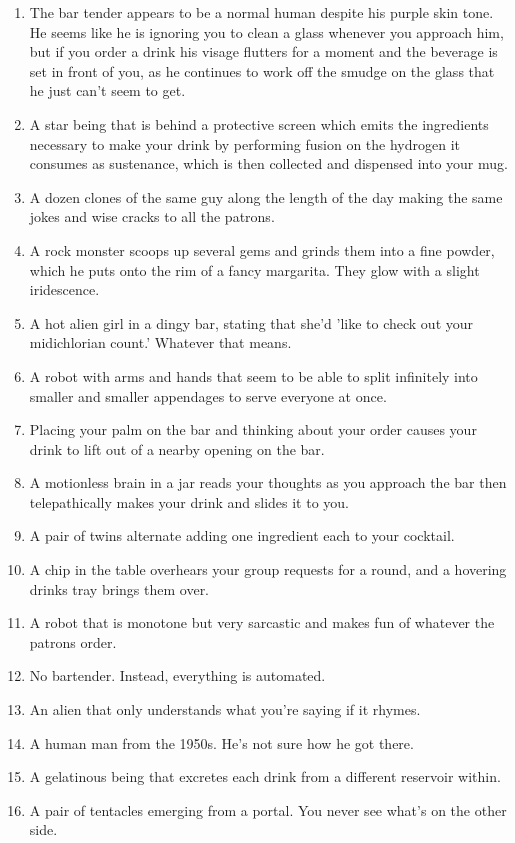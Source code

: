 \documentclass{article}
\begin{document}
\begin{enumerate}
	\item The bar tender appears to be a normal human despite his purple skin tone. He seems like he is ignoring you to clean a glass whenever you approach him, but if you order a drink his visage flutters for a moment and the beverage is set in front of you, as he continues to work off the smudge on the glass that he just can't seem to get.
	\item A star being that is behind a protective screen which emits the ingredients necessary to make your drink by performing fusion on the hydrogen it consumes as sustenance, which is then collected and dispensed into your mug.
	\item A dozen clones of the same guy along the length of the day making the same jokes and wise cracks to all the patrons.
	\item A rock monster scoops up several gems and grinds them into a fine powder, which he puts onto the rim of a fancy margarita. They glow with a slight iridescence.
	\item A hot alien girl in a dingy bar, stating that she'd 'like to check out your midichlorian count.' Whatever that means.
	\item A robot with arms and hands that seem to be able to split infinitely into smaller and smaller appendages to serve everyone at once.
	\item Placing your palm on the bar and thinking about your order causes your drink to lift out of a nearby opening on the bar.
	\item A motionless brain in a jar reads your thoughts as you approach the bar then telepathically makes your drink and slides it to you.
	\item A pair of twins alternate adding one ingredient each to your cocktail.
	\item A chip in the table overhears your group requests for a round, and a hovering drinks tray brings them over.
	\item A robot that is monotone but very sarcastic and makes fun of whatever the patrons order.
	\item No bartender. Instead, everything is automated.
	\item An alien that only understands what you're saying if it rhymes.
	\item A human man from the 1950s. He's not sure how he got there.
	\item A gelatinous being that excretes each drink from a different reservoir within.
	\item A pair of tentacles emerging from a portal. You never see what's on the other side.

\end{enumerate}
\end{document}
